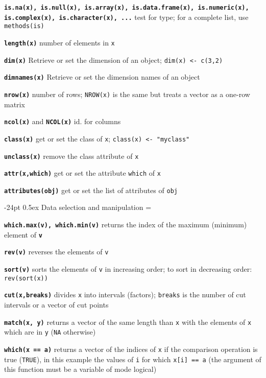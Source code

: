 \documentclass[8pt,landscape]{article}
\makeatletter
\renewcommand\section{\@startsection{section}{1}{0mm}%
                                     {-24pt}%
                                     {0.5ex}%
                                {\color{blue}\normalfont\large\bfseries}}
\newcommand{\code}{\texttt}
\newcommand{\bcode}[1]{\texttt{\textbf{#1}}}
\newcommand\T{\code{TRUE}}
\makeatother
\begin{document}
\begin{multicols*}{3}
\bcode{is.na(x), is.null(x), is.array(x), is.data.frame(x), is.numeric(x),
  is.complex(x), is.character(x), ...} test for type; for a complete list,
  use \code{methods(is)}

\bcode{length(x)}  number of elements in \code{x}

\bcode{dim(x)} Retrieve or set the dimension of an object;
\code{dim(x) <- c(3,2)}

\bcode{dimnames(x)} Retrieve or set the dimension names of an object

\bcode{nrow(x)} number of rows; \code{NROW(x)} is the same but treats
a vector as a one-row matrix

\bcode{ncol(x)} and \bcode{NCOL(x)} id. for columns

\bcode{class(x)} get or set the class of \code{x}; \code{class(x) <- "myclass"}

\bcode{unclass(x)} remove the class attribute of \code{x}

\bcode{attr(x,which)} get or set the attribute \code{which} of \code{x}

\bcode{attributes(obj)} get or set the list of attributes of \code{obj}





\section{Data selection and manipulation}
\everypar={\hangindent=9mm}

\bcode{which.max(v), which.min(v)}  returns the index of the maximum (minimum) element of
\bcode{v}

\bcode{rev(v)}  reverses the elements of \code{v}

\bcode{sort(v)}  sorts the elements of \code{v} in increasing order; to sort in decreasing order: \code{rev(sort(x))}

\bcode{cut(x,breaks)}  divides \code{x} into intervals (factors);
\code{breaks} is the number of cut intervals or a vector of cut points

\bcode{match(x, y)}  returns a vector of the same length than \code{x} with the elements of \code{x} which are in \code{y} (\code{NA} otherwise)

\bcode{which(x == a)}  returns a vector of the indices of \code{x} if the comparison operation is true (\T), in this example the values of \code{i} for which \code{x[i] == a} (the argument of this function must be a variable of mode logical)


\end{multicols*}
\end{document}
